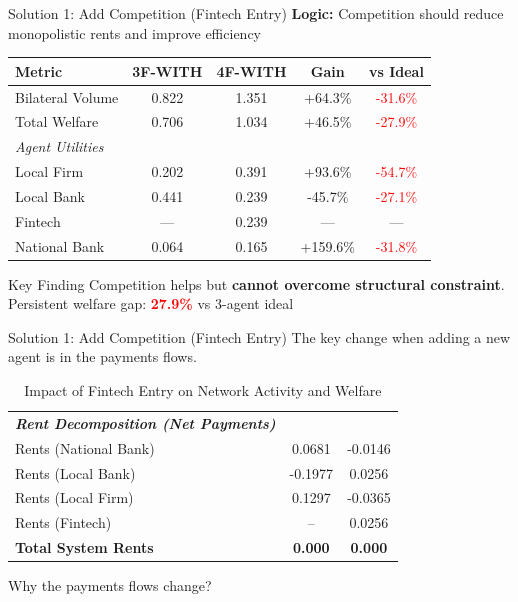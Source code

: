 \documentclass[aspectratio=169]{beamer}
\begin{document}
\begin{frame}{Solution 1: Add Competition (Fintech Entry)}
    \textbf{Logic:} Competition should reduce monopolistic rents and improve efficiency
    
    \vspace{0.3cm}
    \begin{table}
        \centering
        \small
        \begin{tabular}{lcccc}
            \toprule
            \textbf{Metric} & \textbf{3F-WITH} & \textbf{4F-WITH} & \textbf{Gain} & \textbf{vs Ideal} \\
            \midrule
            Bilateral Volume & 0.822 & 1.351 & +64.3\% & \textcolor{red}{-31.6\%} \\
            Total Welfare & 0.706 & 1.034 & +46.5\% & \textcolor{red}{-27.9\%} \\
            \midrule
            \textit{Agent Utilities} \\
            Local Firm & 0.202 & 0.391 & +93.6\% & \textcolor{red}{-54.7\%} \\
            Local Bank & 0.441 & 0.239 & -45.7\% & \textcolor{red}{-27.1\%} \\
            Fintech & --- & 0.239 & --- & --- \\
            National Bank & 0.064 & 0.165 & +159.6\% & \textcolor{red}{-31.8\%} \\
            \bottomrule
        \end{tabular}
    \end{table}
    
    \vspace{0.3cm}
    \begin{alertblock}{Key Finding}
        Competition helps but \textbf{cannot overcome structural constraint}. \\
        Persistent welfare gap: \textcolor{red}{\textbf{27.9\%}} vs 3-agent ideal
    \end{alertblock}
\end{frame}
\begin{frame}{Solution 1: Add Competition (Fintech Entry)}
    The key change when adding a new agent is in the payments flows. 
    
    \begin{table}[h]
\centering
\caption{Impact of Fintech Entry on Network Activity and Welfare}
\label{tab:fintech_impact}
\begin{tabular}{lcc}
\hline
\textit{\textbf{Rent Decomposition (Net Payments)}} & &  \\
Rents (National Bank) & 0.0681 & -0.0146  \\
Rents (Local Bank) & -0.1977 & 0.0256  \\
Rents (Local Firm) & 0.1297 & -0.0365  \\
Rents (Fintech) & -- & 0.0256  \\ \hline
\textbf{Total System Rents} & \textbf{0.000} & \textbf{0.000} \\
\hline
\end{tabular}
\end{table}
Why the payments flows change?

\end{frame}
\end{document}
